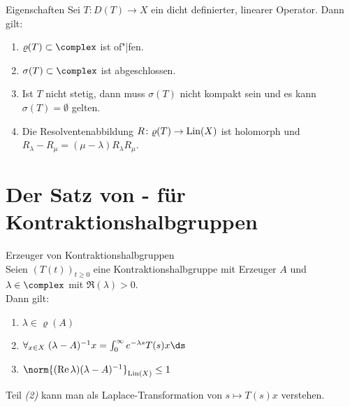 \linie

\begin{Satz}{Eigenschaften}
    Sei $T\colon D(T) \rightarrow X$ ein dicht definierter, linearer Operator.
    Dann gilt:
    \begin{enumerate}
        \item
        $\varrho(T) \subset \complex$ ist of"|fen.

        \item
        $\sigma(T) \subset \complex$ ist abgeschlossen.

        \item
        Ist $T$ nicht stetig, dann muss $\sigma(T)$ nicht kompakt sein und es kann
        $\sigma(T) = \emptyset$ gelten.

        \item
        Die Resolventenabbildung $R\colon \varrho(T) \rightarrow \operatorname{Lin}(X)$
        ist holomorph und $R_\lambda - R_\mu = (\mu - \lambda) R_\lambda R_\mu$.
    \end{enumerate}
\end{Satz}

\section{%
    Der Satz von - für Kontraktionshalbgruppen%
}

\begin{Satz}{Erzeuger von Kontraktionshalbgruppen}\\
    Seien $(T(t))_{t \ge 0}$ eine Kontraktionshalbgruppe mit Erzeuger $A$ und
    $\lambda \in \complex$ mit $\Re(\lambda) > 0$.\\
    Dann gilt:
    \begin{enumerate}
        \item
        $\lambda \in \varrho(A)$

        \item
        $\forall_{x \in X}\; (\lambda-A)^{-1} x = \int_0^\infty e^{-\lambda s} T(s) x \ds$

        \item
        $\norm{(\Re \lambda) (\lambda-A)^{-1}}_{\Lin(X)} \le 1$
    \end{enumerate}
\end{Satz}

\begin{Bem}
    Teil \emph{(2)} kann man als Laplace-Transformation von $s \mapsto T(s) x$ verstehen.
\end{Bem}


